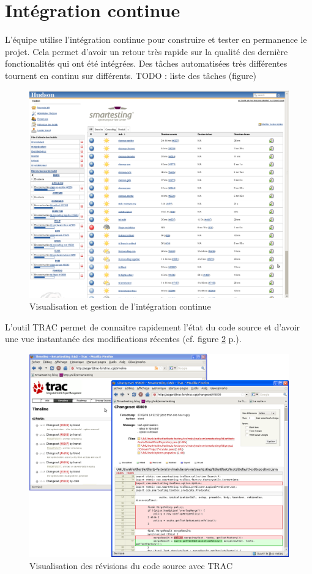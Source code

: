 \section{Intégration continue}
L'équipe utilise l'intégration continue pour construire et tester en permanence le projet. Cela permet d'avoir un retour très rapide sur la qualité des dernière fonctionalités qui ont été intégrées. Des tâches automatisées très différentes tournent en continu sur différents. 
TODO : liste des tâches (figure)

\begin{figure}[!h]
\centering
\includegraphics[width=\textwidth]{Illustrations/hudson.png}
\caption{Visualisation et gestion de l'intégration continue}
\label{figure:hudson}
\end{figure}

L'outil TRAC permet de connaitre rapidement l'état du code source et d'avoir une vue instantanée des modifications récentes (cf. figure \ref{figure:trac} p.\pageref{figure:trac}).

\begin{figure}[!h]
\centering
\includegraphics[width=\textwidth]{Illustrations/trac.png}
\caption{Visualisation des révisions du code source avec TRAC}
\label{figure:trac}
\end{figure}



